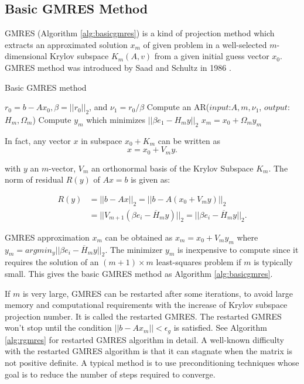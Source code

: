 \subsection{Basic GMRES Method}

GMRES (Algorithm \ref{alg:basicgmres}) is a kind of projection method which extracts an approximated solution $x_m$ of given problem in a well-selected $m$-dimensional Krylov subspace \(K_m(A,v)\) from a given initial guess vector $x_0$.  GMRES method was introduced by Saad and  Schultz in 1986 \cite{saad1986gmres}.

\begin{algorithm}[htbp]
	\caption{Basic GMRES method}
	\label{alg:basicgmres}
	\begin{algorithmic}[1]
		\State $r_0=b-A x_0, \beta=||r_0||_2$, and $\nu_1=r_0/\beta$
		\State Compute an AR($input$:$A,m,\nu_1$, $output$: $H_m, \Omega_m$)
		\State Compute $y_m$ which minimizes $||\beta e_1-H_m y||_2$ \label{least squares in GMRES}
		\State $x_m=x_0+\Omega_my_m$
		\EndFunction
	\end{algorithmic}
\end{algorithm}

In fact, any vector $x$ in subspace $x_0+K_m$ can be written as 
\begin{equation}
x = x_0 + V_m y.
\end{equation}

with $y$ an $m$-vector, $V_m$ an orthonormal basis of the Krylov Subspace $K_m$. The norm of residual $R(y)$ of $Ax=b$ is given as:

\begin{equation}
\begin{aligned}
R(y) & = ||b-Ax||_2 =||b-A(x_0+V_m y)||_2 \\&= ||V_{m+1}(\beta e_i - \overline{H}_m y)||_2 = ||\beta e_i - \overline{H}_m y||_2.
\end{aligned}
\end{equation}

GMRES approximation $x_m$ can be obtained as $x_m = x_0+V_my_m$ where $y_m = argmin_y||\beta e_i - \overline{H}_m y||_2$. The minimizer $y_m$ is inexpensive to compute since it requires the solution of an $(m+1) \times m$ least-squares problem if $m$ is typically small. This gives the basic GMRES method as Algorithm \ref{alg:basicgmres}.

If $m$ is very large, GMRES can be restarted after some iterations, to avoid large memory and computational requirements with the increase of Krylov subspace projection number. It is called the restarted GMRES. The restarted GMRES won't stop until the condition $||b-Ax_m||<\epsilon_g$ is satisfied. See Algorithm \ref{alg:rgmres} for restarted GMRES algorithm in detail. A well-known difficulty with the restarted GMRES algorithm is that it can stagnate when the matrix is not positive definite. A typical method is to use preconditioning techniques whose goal is to reduce the number of steps required to converge.


